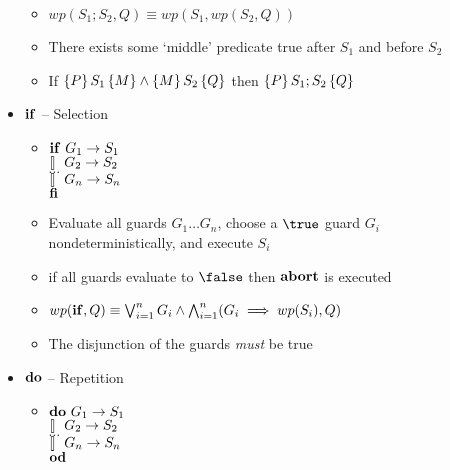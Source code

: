 \begin{itemize}
	\begin{itemize}
		
		\item $ wp(S_1; S_2, Q) \equiv wp(S_1, wp(S_2, Q)) $
		
		\item There exists some `middle' predicate true after $ S_1 $ and before $ S_2 $
		
		\item If $ \left\lbrace P \right\rbrace S_1 \left\lbrace M \right\rbrace \land \left\lbrace M \right\rbrace S_2 \left\lbrace Q \right\rbrace $ then $ \left\lbrace P \right\rbrace S_1; S_2 \left\lbrace Q \right\rbrace $
		
	\end{itemize}
	
	\item $ {\bf if} $ -- Selection
	
	\begin{itemize}
		
		\item
		$ {\bf if} ~ G_1 \rightarrow S_1  $\\
		$ \mathrel{\tt [\hspace*{-1pt}]} ~ G_2 \rightarrow S_2 $\\
		$ \dots $\\
		$ \mathrel{\tt [\hspace*{-1pt}]} ~ G_n \rightarrow S_n $\\
		$ {\bf fi} $
		
		\item Evaluate all guards $ G_1 \dots G_n$, choose a $ \true $ guard $ G_i $ nondeterministically, and execute $ S_i $
		
		\item if all guards evaluate to $ \false $ then $ {\bf abort} $ is executed
	
		\item $ wp({\bf if}, Q) \equiv \bigvee_{i=1}^{n} G_i \land \bigwedge_{i=1}^{n} (G_i \implies wp(S_i), Q)  $
		\item The disjunction of the guards \textit{must} be true
			
	\end{itemize}
	
	\item $ {\bf do} $ -- Repetition
	
	\begin{itemize}
		
		\item
		$ {\bf do} ~ G_1 \rightarrow S_1  $\\
		$ \mathrel{\tt [\hspace*{-1pt}]} ~ G_2 \rightarrow S_2 $\\
		$ \dots $\\
		$ \mathrel{\tt [\hspace*{-1pt}]} ~ G_n \rightarrow S_n $\\
		$ {\bf od} $
		

\end{itemize}
\end{itemize}

